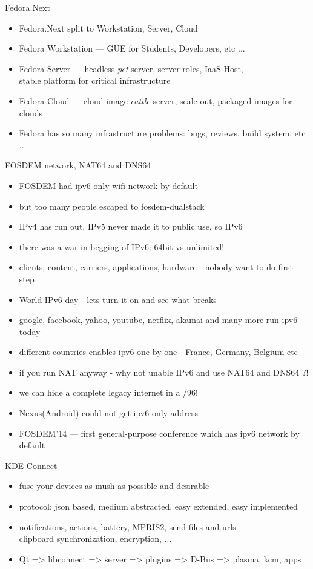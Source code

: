 \documentclass[aspectratio=169]{beamer}
\begin{document}
\begin{frame}{Fedora.Next}
  \begin{itemize}
  \item Fedora.Next split to Workstation, Server, Cloud
  \item Fedora Workstation --- GUE for Students, Developers, etc ...
  \item Fedora Server --- headless {\it pet} server, server roles, IaaS Host,
        \\stable platform for critical infrastructure
  \item Fedora Cloud --- cloud image {\it cattle} server, scale-out, packaged images for clouds
  \item Fedora has so many infrastructure problems: bugs, reviews, build system, etc ...
  \end{itemize}
\end{frame}

\begin{frame}{FOSDEM network, NAT64 and DNS64}
  \begin{itemize}
  \item FOSDEM had ipv6-only wifi network by default
  \item but too many people escaped to fosdem-dualstack
  \item IPv4 has run out, IPv5 never made it to public use, so IPv6
  \item there was a war in begging of IPv6: 64bit vs unlimited!
  \item clients, content, carriers, applications, hardware - nobody want to do first step
  \item World IPv6 day - lets turn it on and see what breaks
  \item google, facebook, yahoo, youtube, netflix, akamai and many more run ipv6 today
  \item different countries enables ipv6 one by one - France, Germany, Belgium etc
  \item if you run NAT anyway - why not unable IPv6 and use NAT64 and DNS64 ?!
  \item we can hide a complete legacy internet in a /96!
  \item Nexus(Android) could not get ipv6 only address
  \item FOSDEM'14 --- first general-purpose conference which has ipv6 network by default
  \end{itemize}
\end{frame}

\begin{frame}{KDE Connect}
  \begin{itemize}
  \item fuse your devices as mush as possible and desirable
  \item protocol: json based, medium abstracted, easy extended, easy implemented
  \item notifications, actions, battery, MPRIS2, send files and urls
        \\clipboard synchronization, encryption, ...
  \item Qt => libconnect => server => plugins => D-Bus => plasma, kcm, apps
  \end{itemize}
\end{frame}  
  
\end{document}
